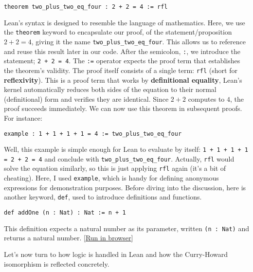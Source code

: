 \begin{example}\mbox{}

\begin{lstlisting}[language=Lean]
    theorem two_plus_two_eq_four : 2 + 2 = 4 := rfl
\end{lstlisting}
Lean's syntax is designed to resemble the language of mathematics. 
Here, we use the \lstinline[language=lean]|theorem| keyword to encapsulate our proof, 
of the statement/proposition $2 + 2 = 4$, 
giving it the name \lstinline[language=lean]|two_plus_two_eq_four|. 
This allows us to reference and reuse this result later in our code.
After the semicolon, \lstinline[language=lean]|:|, we introduce the
statement; \lstinline[language=lean]|2 + 2 = 4|.
The \lstinline[language=lean]|:=| operator expects the 
proof term that establishes the theorem's validity. 
The proof itself consists of a single term: \lstinline[language=lean]|rfl| 
(short for \textbf{reflexivity}). This is a proof term that works by 
\textbf{definitional equality}, Lean's kernel automatically reduces both sides of the equation 
to their normal (definitional) form and verifies they are identical. 
Since $2 + 2$ computes to $4$, the proof succeeds immediately.
We can now use this theorem in subsequent proofs. For instance:
\begin{lstlisting}[language=Lean]
    example : 1 + 1 + 1 + 1 = 4 := two_plus_two_eq_four
\end{lstlisting}
Well, this example is simple enough for Lean to evaluate by itself:
\lstinline[language=lean]|1 + 1 + 1 + 1 = 2 + 2 = 4|
and conclude with \lstinline[language=lean]|two_plus_two_eq_four|. 
Actually, \lstinline[language=lean]|rfl| would solve the equation similarly, 
so this is just applying \lstinline[language=lean]|rfl| again (it's a bit of cheating).
Here, I used \lstinline[language=lean]|example|, which is handy for defining anonymous 
expressions for demonstration purposes.
Before diving into the discussion, here is another keyword, \lstinline[language=lean]|def|, 
used to introduce definitions and functions.

\begin{lstlisting}[language=Lean]
    def addOne (n : Nat) : Nat := n + 1
\end{lstlisting}
This definition expects a natural number as its parameter, written \lstinline[language=lean]|(n : Nat)|
and returns a natural number.
[\href{https://live.lean-lang.org/\#codez=YOUR_ENCODED_URL_HERE}{Run in browser}]
\end{example}
Let's now turn to how logic is handled in Lean and how the Curry-Howard 
isomorphism is reflected concretely.

